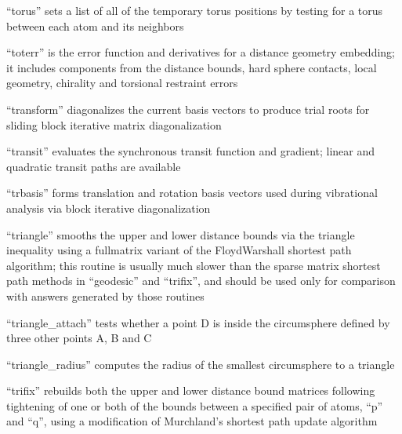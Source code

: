 \documentclass[letterpaper,11pt,english]{sphinxmanual}
\begin{document}
\sphinxAtStartPar
“torus” sets a list of all of the temporary torus positions by testing for a torus between each atom and its neighbors

\sphinxAtStartPar
{}

\sphinxAtStartPar
“toterr” is the error function and derivatives for a distance geometry embedding; it includes components from the distance bounds, hard sphere contacts, local geometry, chirality and torsional restraint errors

\sphinxAtStartPar
{}

\sphinxAtStartPar
“transform” diagonalizes the current basis vectors to produce trial roots for sliding block iterative matrix diagonalization

\sphinxAtStartPar
{}

\sphinxAtStartPar
“transit” evaluates the synchronous transit function and gradient; linear and quadratic transit paths are available

\sphinxAtStartPar
{}

\sphinxAtStartPar
“trbasis” forms translation and rotation basis vectors used during vibrational analysis via block iterative diagonalization

\sphinxAtStartPar
{}

\sphinxAtStartPar
“triangle” smooths the upper and lower distance bounds via the triangle inequality using a full\sphinxhyphen{}matrix variant of the Floyd\sphinxhyphen{}Warshall shortest path algorithm; this routine is usually much slower than the sparse matrix shortest path methods in “geodesic” and “trifix”, and should be used only for comparison with answers generated by those routines

\sphinxAtStartPar
{}

\sphinxAtStartPar
“triangle\_attach” tests whether a point D is inside the circumsphere defined by three other points A, B and C

\sphinxAtStartPar
{}

\sphinxAtStartPar
“triangle\_radius” computes the radius of the smallest circumsphere to a triangle

\sphinxAtStartPar
{}

\sphinxAtStartPar
“trifix” rebuilds both the upper and lower distance bound matrices following tightening of one or both of the bounds between a specified pair of atoms, “p” and “q”, using a modification of Murchland’s shortest path update algorithm
\end{document}
